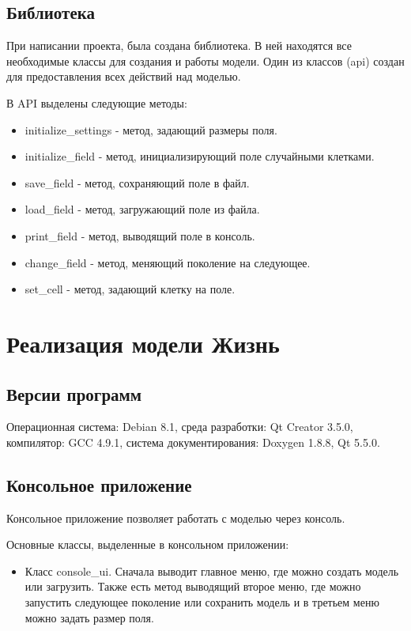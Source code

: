 \documentclass[a4paper]{article}
\begin{document}
\subsection{Библиотека}
При написании проекта, была создана библиотека. В ней находятся все необходимые классы для создания и работы модели. Один из классов (api) создан для предоставления всех действий над моделью.

\noindent В API выделены следующие методы: 
\begin{itemize}
\item initialize\_settings - метод, задающий размеры поля.
\item initialize\_field - метод, инициализирующий поле случайными клетками.
\item save\_field - метод, сохраняющий поле в файл.
\item load\_field - метод, загружающий поле из файла.
\item print\_field - метод, выводящий поле в консоль.
\item change\_field - метод, меняющий поколение на следующее.
\item set\_cell - метод, задающий клетку на поле. 
\end{itemize}


\section{Реализация модели Жизнь}
\subsection{Версии программ}
Операционная система: Debian 8.1, среда разработки: Qt Creator 3.5.0, компилятор: GCC 4.9.1, система документирования: Doxygen 1.8.8, Qt 5.5.0.

\subsection{Консольное приложение}
Консольное приложение позволяет работать с моделью через консоль.

\noindent Основные классы, выделенные в консольном приложении:
\begin{itemize}
\item Класс console\_ui. Сначала выводит главное меню, где можно создать модель или загрузить. Также есть метод выводящий второе меню, где можно запустить следующее поколение или сохранить модель и в третьем меню можно задать размер поля. 
\end{itemize}
\end{document}
